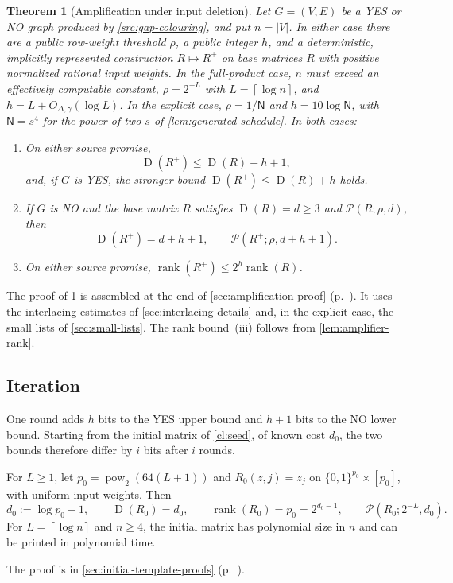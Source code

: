 \documentclass[11pt,letterpaper]{article} \usepackage[utf8]{inputenc}
\theoremstyle{plain} \newtheorem{theorem}{Theorem}[section]
\theoremstyle{definition} \newaliascnt{definition}{theorem}
\newcommand{\D}{\operatorname{D}}
\newcommand{\RP}[3]{\mathcal{P}(#1;#2,#3)}
\newcommand{\ceil}[1]{\left\lceil#1\right\rceil}
\DeclareMathOperator{\rank}{rank} \crefname{claim}{Claim}{Claims}
\begin{document}
\begin{theorem}[Amplification under input deletion]
\label{thm:amplifier}
Let \(G=(V,E)\) be a YES or NO graph produced by \cref{src:gap-colouring},
and put \(n=|V|\). In either case there are a public row-weight threshold
\(\rho\), a public integer \(h\), and a deterministic, implicitly represented
construction \(R\mapsto R^+\) on base matrices \(R\) with positive normalized
rational input weights. In the full-product case, \(n\) must exceed an
effectively computable constant, \(\rho=2^{-L}\) with \(L=\ceil{\log n}\), and
\(h=L+O_{\Delta,\gamma}(\log L)\). In the explicit case, \(\rho=1/\mathsf N\)
and \(h=10\log\mathsf N\), with \(\mathsf N=s^4\) for the power of two \(s\) of
\cref{lem:generated-schedule}. In both cases:
\begin{enumerate}
\item[(i)] On either source promise,
\[
\D(R^+)\le\D(R)+h+1,
\]
and, if \(G\) is YES, the stronger bound \(\D(R^+)\le\D(R)+h\) holds.
\item[(ii)] If \(G\) is NO and the base matrix \(R\) satisfies \(\D(R)=d\ge3\)
and \(\RP{R}{\rho}{d}\), then
\[
\D(R^+)=d+h+1,\qquad \RP{R^+}{\rho}{d+h+1}.
\]
\item[(iii)] On either source promise, \(\rank(R^+)\le2^h\rank(R)\).
\end{enumerate}
\end{theorem}

The proof of \cref{thm:amplifier} is assembled at the end of \cref{sec:amplification-proof}
(p.~\pageref{proof:thm:amplifier}). It uses the interlacing estimates of
\cref{sec:interlacing-details} and, in the explicit case, the small lists of
\cref{sec:small-lists}. The rank bound~(iii) follows from \cref{lem:amplifier-rank}.


\subsection{Iteration}

One round adds $h$ bits to the YES upper bound and $h+1$ bits to the NO
lower bound. Starting from the initial matrix of \cref{cl:seed}, of known cost
$d_0$, the two bounds therefore differ by $i$ bits after $i$ rounds.

\begin{lemma}\label{cl:seed}
For $L\ge1$, let $p_0=\operatorname{pow}_2(64(L+1))$ and
$R_0(z,j)=z_j$ on $\{0,1\}^{p_0}\times[p_0]$, with uniform input weights. Then
\[
d_0:=\log p_0+1,\qquad \D(R_0)=d_0,\qquad
\rank(R_0)=p_0=2^{d_0-1},\qquad \RP{R_0}{2^{-L}}{d_0}.
\]
For $L=\ceil{\log n}$ and $n\ge4$, the initial matrix has polynomial size in $n$
and can be printed in polynomial time.
\end{lemma}
The proof is in \cref{sec:initial-template-proofs}
(p.~\pageref{proof:cl:seed}).
\end{document}
